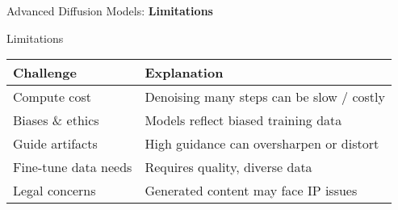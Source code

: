 \begin{frame}{}
    \LARGE Advanced Diffusion Models: \textbf{Limitations}
\end{frame}

\begin{frame}{Limitations}
\begin{tabular}{p{3.5cm} p{8cm}}
\textbf{Challenge} & \textbf{Explanation} \\
\hline
Compute cost & Denoising many steps can be slow / costly \\[0.8em]
Biases \& ethics & Models reflect biased training data \\[0.8em]
Guide artifacts & High guidance can oversharpen or distort \\[0.8em]
Fine-tune data needs & Requires quality, diverse data \\[0.8em]
Legal concerns & Generated content may face IP issues \\
\end{tabular}
\end{frame}